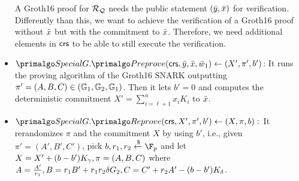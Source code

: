 \begin{itemize}
A Groth16 proof for $ \mathcal{R}_{\mathcal{Q}} $ needs the public statement $ (\bar{y},\bar{x})$ for verification. Differently than this, we want to achieve the verification of a Groth16 proof without $ \bar{x} $ but with the commitment to $ \bar{x} $. Therefore, we need additional elements in $ \mathsf{crs} $ to be able to still execute the verification.
\item $\SpecialG.\Preprove(\crs, \bar{y}, \bar{x}, \baromega_1) \leftarrow (X', \pi', b')$: It runs the proving algorithm of the Groth16 SNARK outputting $ \pi' = (A, B, C)  \in (\mathbb{G}_1, \mathbb{G}_2, \mathbb{G}_1)$. Then it lets $ b' = 0 $ and computes the deterministic commitment $ X' = \sum_{i = \ell +1}^n x_i K_i$ to  $ \bar{x} $.
\item$\SpecialG.\Reprove(\crs, X', \pi', b') \leftarrow (X, \pi, b):$ It rerandomizes $ \pi $ and the commitment $ X $  by using $ b' $, i.e., given $ \pi' = (A',B',C') $, pick $ b , r_1, r_2  \xleftarrow{\$} \F_p $ and let $ X = X' + (b- b') K_{\gamma}, \pi = (A, B, C)  $ where $ A = \frac{A'}{r_1}, B = r_1 B' + r_1r_2 \delta {G}_2, C = C' + r_2A'  - (b - b') K_{\delta} $.



\end{itemize}
